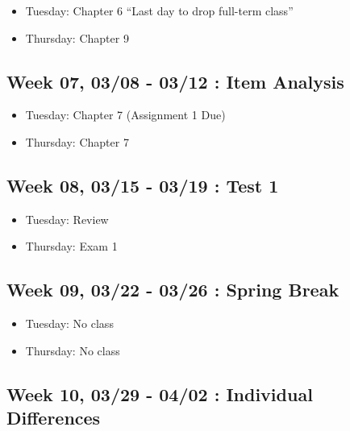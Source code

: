 \documentclass[11pt,]{article}
\providecommand{\tightlist}{%
  \setlength{\itemsep}{0pt}\setlength{\parskip}{0pt}}
\begin{document}
\begin{itemize}
\tightlist
\item
  Tuesday: Chapter 6 ``Last day to drop full-term class''
\item
  Thursday: Chapter 9
\end{itemize}

\hypertarget{week-07-0308---0312-item-analysis}{%
\subsection{Week 07, 03/08 - 03/12 : Item
Analysis}\label{week-07-0308---0312-item-analysis}}

\begin{itemize}
\tightlist
\item
  Tuesday: Chapter 7 (Assignment 1 Due)
\item
  Thursday: Chapter 7
\end{itemize}

\hypertarget{week-08-0315---0319-test-1}{%
\subsection{Week 08, 03/15 - 03/19 : Test
1}\label{week-08-0315---0319-test-1}}

\begin{itemize}
\tightlist
\item
  Tuesday: Review
\item
  Thursday: Exam 1
\end{itemize}

\hypertarget{week-09-0322---0326-spring-break}{%
\subsection{Week 09, 03/22 - 03/26 : Spring
Break}\label{week-09-0322---0326-spring-break}}

\begin{itemize}
\tightlist
\item
  Tuesday: No class
\item
  Thursday: No class
\end{itemize}

\hypertarget{week-10-0329---0402-individual-differences}{%
\subsection{Week 10, 03/29 - 04/02 : Individual
Differences}\label{week-10-0329---0402-individual-differences}}
\end{document}
